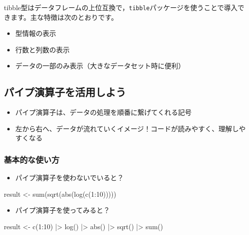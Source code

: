 \documentclass[
  a4paper,
]{ltjsbook}
\newenvironment{Shaded}{\begin{snugshade}}{\end{snugshade}}
\newcommand{\DecValTok}[1]{\textcolor[rgb]{0.68,0.00,0.00}{#1}}
\newcommand{\FunctionTok}[1]{\textcolor[rgb]{0.28,0.35,0.67}{#1}}
\newcommand{\NormalTok}[1]{\textcolor[rgb]{0.00,0.23,0.31}{#1}}
\newcommand{\OtherTok}[1]{\textcolor[rgb]{0.00,0.23,0.31}{#1}}
\newcommand{\SpecialCharTok}[1]{\textcolor[rgb]{0.37,0.37,0.37}{#1}}
\providecommand{\tightlist}{%
  \setlength{\itemsep}{0pt}\setlength{\parskip}{0pt}}\usepackage{longtable,booktabs,array}
\begin{document}
tibble型はデータフレームの上位互換で，\texttt{tibble}パッケージを使うことで導入できます。主な特徴は次のとおりです。

\begin{itemize}
\tightlist
\item
  型情報の表示
\item
  行数と列数の表示
\item
  データの一部のみ表示（大きなデータセット時に便利）
\end{itemize}

\subsection{パイプ演算子を活用しよう}\label{ux30d1ux30a4ux30d7ux6f14ux7b97ux5b50ux3092ux6d3bux7528ux3057ux3088ux3046}

\begin{itemize}
\tightlist
\item
  パイプ演算子は、データの処理を順番に繋げてくれる記号
\item
  左から右へ、データが流れていくイメージ！コードが読みやすく、理解しやすくなる
\end{itemize}

\subsubsection{基本的な使い方}\label{ux57faux672cux7684ux306aux4f7fux3044ux65b9}

\begin{itemize}
\tightlist
\item
  パイプ演算子を使わないでいると？
\end{itemize}

\begin{Shaded}
\begin{Highlighting}[]
\NormalTok{result }\OtherTok{\textless{}{-}} \FunctionTok{sum}\NormalTok{(}\FunctionTok{sqrt}\NormalTok{(}\FunctionTok{abs}\NormalTok{(}\FunctionTok{log}\NormalTok{(}\FunctionTok{c}\NormalTok{(}\DecValTok{1}\SpecialCharTok{:}\DecValTok{10}\NormalTok{)))))}
\end{Highlighting}
\end{Shaded}

\begin{itemize}
\tightlist
\item
  パイプ演算子を使ってみると？
\end{itemize}

\begin{Shaded}
\begin{Highlighting}[]
\NormalTok{result }\OtherTok{\textless{}{-}} \FunctionTok{c}\NormalTok{(}\DecValTok{1}\SpecialCharTok{:}\DecValTok{10}\NormalTok{) }\SpecialCharTok{|\textgreater{}}
    \FunctionTok{log}\NormalTok{() }\SpecialCharTok{|\textgreater{}}
    \FunctionTok{abs}\NormalTok{() }\SpecialCharTok{|\textgreater{}}
    \FunctionTok{sqrt}\NormalTok{() }\SpecialCharTok{|\textgreater{}}
    \FunctionTok{sum}\NormalTok{()}
\end{Highlighting}
\end{Shaded}
\end{document}
